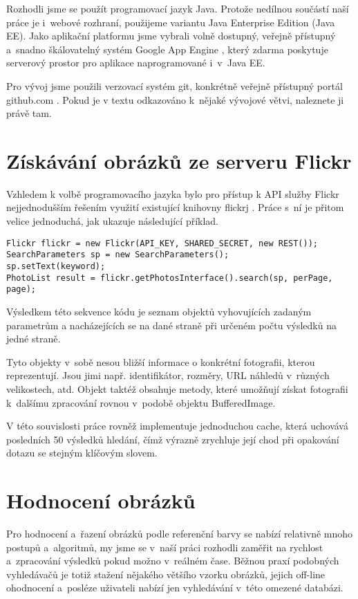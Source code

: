 \documentclass[12pt,oneside,a4paper]{article}
\newenvironment{listing}
{\begin{list}{}{\setlength{\leftmargin}{1em}}\item\scriptsize\bfseries}
{\end{list}}
\begin{document}
Rozhodli jsme se použít programovací jazyk Java. Protože nedílnou součástí naší práce je i~webové rozhraní, použijeme variantu Java Enterprise Edition (Java EE). Jako aplikační platformu jsme vybrali volně dostupný, veřejně přístupný a~snadno škálovatelný systém Google App Engine \cite{GoogleAE}, který zdarma poskytuje serverový prostor pro aplikace naprogramované i~v~Java EE.

Pro vývoj jsme použili verzovací systém git, konkrétně veřejně přístupný portál github.com \cite{official}. Pokud je v textu odkazováno k~nějaké vývojové větvi, naleznete ji právě tam.

\section{Získávání obrázků ze serveru Flickr}
Vzhledem k volbě programovacího jazyka bylo pro přístup k API služby Flickr nejjednodušším řešením využití existující knihovny flickrj \cite{flickrj}. Práce s~ní je přitom velice jednoduchá, jak ukazuje následující příklad.

\begin{listing}
\begin{verbatim}
Flickr flickr = new Flickr(API_KEY, SHARED_SECRET, new REST());
SearchParameters sp = new SearchParameters();
sp.setText(keyword);
PhotoList result = flickr.getPhotosInterface().search(sp, perPage, page);
\end{verbatim}
\end{listing}

Výsledkem této sekvence kódu je seznam objektů vyhovujících zadaným parametrům a nacházejících se na dané straně při určeném počtu výsledků na jedné straně.

Tyto objekty v~sobě nesou bližší informace o konkrétní fotografii, kterou reprezentují. Jsou jimi např. identifikátor, rozměry, URL náhledů v~různých velikostech, atd. Objekt taktéž obsahuje metody, které umožňují získat fotografii k~dalšímu zpracování rovnou v~podobě objektu BufferedImage.

V této souvislosti práce rovněž implementuje jednoduchou cache, která uchovává posledních 50 výsledků hledání, čímž výrazně zrychluje její chod při opakování dotazu se stejným klíčovým slovem.

\section{Hodnocení obrázků}
Pro hodnocení a~řazení obrázků podle referenční barvy se nabízí relativně mnoho postupů a~algoritmů, my jsme se v~naší práci rozhodli zaměřit na rychlost a~zpracování výsledků pokud možno v~reálném čase. Běžnou praxí podobných vyhledávačů je totiž stažení nějakého většího vzorku obrázků, jejich off-line ohodnocení a~posléze uživateli nabízí jen vyhledávání v~této omezené databázi.
\end{document}
